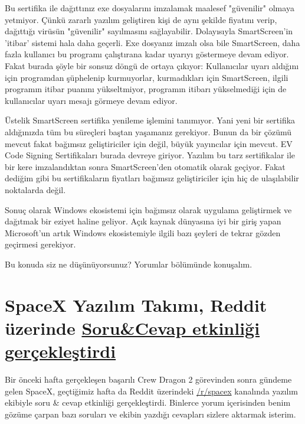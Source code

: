 \documentclass[11pt]{article}
\begin{document}
Bu sertifika ile dağıttınız exe dosyalarını imzalamak maalesef "güvenilir"
olmaya yetmiyor. Çünkü zararlı yazılım geliştiren kişi de aynı şekilde
fiyatını verip, dağıttığı virüsün "güvenilir" sayılmasını sağlayabilir.
Dolayısıyla SmartScreen'in 'itibar' sistemi hala daha geçerli. Exe dosyanız
imzalı olsa bile SmartScreen, daha fazla kullanıcı bu programı çalıştırana
kadar uyarıyı göstermeye devam ediyor. Fakat burada şöyle bir sonsuz döngü de
ortaya çıkıyor: Kullanıcılar uyarı aldığını için programdan şüphelenip
kurmuyorlar, kurmadıkları için SmartScreen, ilgili programın itibar puanını
yükseltmiyor, programın itibarı yükselmediği için de kullanıcılar uyarı mesajı
görmeye devam ediyor.

Üstelik SmartScreen sertifika yenileme işlemini tanımıyor. Yani yeni bir
sertifika aldığınızda tüm bu süreçleri baştan yaşamanız gerekiyor. Bunun da
bir çözümü mevcut fakat bağımsız geliştiriciler için değil, büyük yayıncılar
için mevcut. EV Code Signing Sertifikaları burada devreye giriyor. Yazılım bu
tarz sertifikalar ile bir kere imzalandıktan sonra SmartScreen'den otomatik
olarak geçiyor. Fakat dediğim gibi bu sertifikaların fiyatları bağımsız
geliştiriciler için hiç de ulaşılabilir noktalarda değil.

Sonuç olarak Windows ekosistemi için bağımsız olarak uygulama geliştirmek ve
dağıtmak bir eziyet haline geliyor. Açık kaynak dünyasına iyi bir giriş yapan
Microsoft'un artık Windows ekosistemiyle ilgili bazı şeyleri de tekrar gözden
geçirmesi gerekiyor.

Bu konuda siz ne düşünüyorsunuz? Yorumlar bölümünde konuşalım.
\section{SpaceX Yazılım Takımı, Reddit üzerinde \href{https://www.reddit.com/r/spacex/comments/gxb7j1/we\_are\_the\_spacex\_software\_team\_ask\_us\_anything/}{Soru\&Cevap etkinliği gerçekleştirdi}}
\label{sec:org71b0163}
Bir önceki hafta gerçekleşen başarılı Crew Dragon 2 görevinden sonra gündeme
gelen SpaceX, geçtiğimiz hafta da Reddit üzerindeki \href{https://www.reddit.com/r/spacex/}{/r/spacex} kanalında
yazılım ekibiyle soru \& cevap etkinliği gerçekleştirdi. Binlerce yorum
içerisinden benim gözüme çarpan bazı soruları ve ekibin yazdığı cevapları
sizlere aktarmak isterim.
\end{document}
